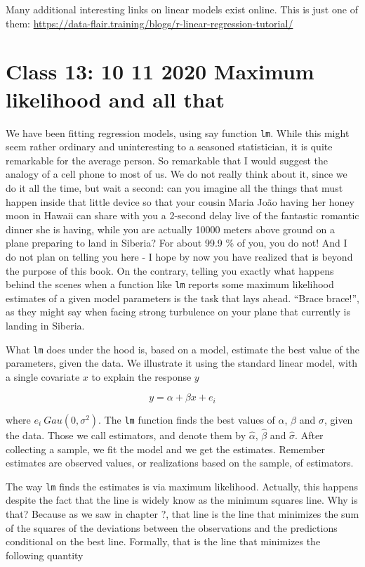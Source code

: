 \documentclass[
]{book}
\begin{document}
Many additional interesting links on linear models exist online. This is just one of them: \url{https://data-flair.training/blogs/r-linear-regression-tutorial/}

\hypertarget{aula12}{%
\chapter{Class 13: 10 11 2020 Maximum likelihood and all that}\label{aula12}}

We have been fitting regression models, using say function \texttt{lm}. While this might seem rather ordinary and uninteresting to a seasoned statistician, it is quite remarkable for the average person. So remarkable that I would suggest the analogy of a cell phone to most of us. We do not really think about it, since we do it all the time, but wait a second: can you imagine all the things that must happen inside that little device so that your cousin Maria João having her honey moon in Hawaii can share with you a 2-second delay live of the fantastic romantic dinner she is having, while you are actually 10000 meters above ground on a plane preparing to land in Siberia? For about 99.9 \% of you, you do not! And I do not plan on telling you here - I hope by now you have realized that is beyond the purpose of this book. On the contrary, telling you exactly what happens behind the scenes when a function like \texttt{lm} reports some maximum likelihood estimates of a given model parameters is the task that lays ahead. ``Brace brace!'', as they might say when facing strong turbulence on your plane that currently is landing in Siberia.

What \texttt{lm} does under the hood is, based on a model, estimate the best value of the parameters, given the data. We illustrate it using the standard linear model, with a single covariate \(x\) to explain the response \(y\)

\[y=\alpha+\beta x+e_i\]

where \(e_i~Gau(0,\sigma^2)\). The \texttt{lm} function finds the best values of \(\alpha\), \(\beta\) and \(\sigma\), given the data. Those we call estimators, and denote them by \(\hat \alpha\), \(\hat \beta\) and \(\hat \sigma\). After collecting a sample, we fit the model and we get the estimates. Remember estimates are observed values, or realizations based on the sample, of estimators.

The way \texttt{lm} finds the estimates is via maximum likelihood. Actually, this happens despite the fact that the line is widely know as the minimum squares line. Why is that? Because as we saw in chapter ?, that line is the line that minimizes the sum of the squares of the deviations between the observations and the predictions conditional on the best line. Formally, that is the line that minimizes the following quantity
\end{document}
